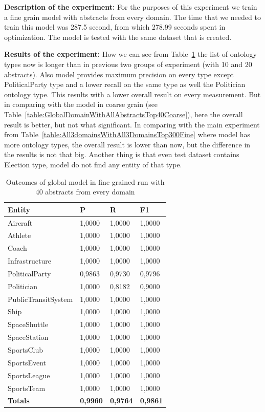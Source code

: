 \documentclass[thesis=M,english]{FITthesis}[2018/05/30]
\begin{document}
	
	\textbf{Description of the experiment:} For the purposes of this experiment we train a fine grain model with abstracts from every domain. The time that we needed to train this model was 287.5 second, from which 278.99 seconds spent in optimization. The model is tested with the same dataset that is created.

	\textbf{Results of the experiment:} How we can see from Table~\ref{table:GlobalDomainWithAllAbstractsTop40Fine} the list of ontology types now is longer than in previous two groups of experiment (with 10 and 20 abstracts). Also model provides maximum precision on every type except PoliticalParty type and a lower recall on the same type as well the Politician ontology type. This results with a lower overall result on every measurement. But in comparing with the model in coarse grain (see Table~\ref{table:GlobalDomainWithAllAbstractsTop40Coarse}), here the overall result is better, but not what significant. In comparing with the main experiment from Table~\ref{table:All3domainsWithAll3DomainsTop300Fine} where model has more ontology types, the overall result is lower than now, but the difference in the results is not that big. Another thing is that even test dataset contains Election type, model do not find any entity of that type.  
	
	\begin{table}[H]\centering
		\begin{tabular}{|l|l|l|l|}
			\hline {\textbf{Entity}} & {\textbf{P}} & {\textbf{R}} & {\textbf{F1}}\\\hline
				Aircraft & 1,0000 & 1,0000 & 1,0000\\
				Athlete & 1,0000 & 1,0000 & 1,0000\\
				Coach & 1,0000 & 1,0000 & 1,0000\\
				Infrastructure & 1,0000 & 1,0000 & 1,0000\\
				PoliticalParty & 0,9863 & 0,9730 & 0,9796\\
				Politician & 1,0000 & 0,8182 & 0,9000\\
				PublicTransitSystem & 1,0000 & 1,0000 & 1,0000\\
				Ship & 1,0000 & 1,0000 & 1,0000\\
				SpaceShuttle & 1,0000 & 1,0000 & 1,0000\\
				SpaceStation & 1,0000 & 1,0000 & 1,0000\\ 
				SportsClub & 1,0000 & 1,0000 & 1,0000\\
				SportsEvent & 1,0000 & 1,0000 & 1,0000\\
				SportsLeague & 1,0000 & 1,0000 & 1,0000\\
				SportsTeam & 1,0000 & 1,0000 & 1,0000\\\hline
				\textbf{Totals} & \textbf{0,9960} & \textbf{0,9764} & \textbf{0,9861}\\\hline
		\end{tabular}
		\caption{Outcomes of global model in fine grained run with 40 abstracts from every domain \label{table:GlobalDomainWithAllAbstractsTop40Fine}}
	\end{table}
\end{document}
